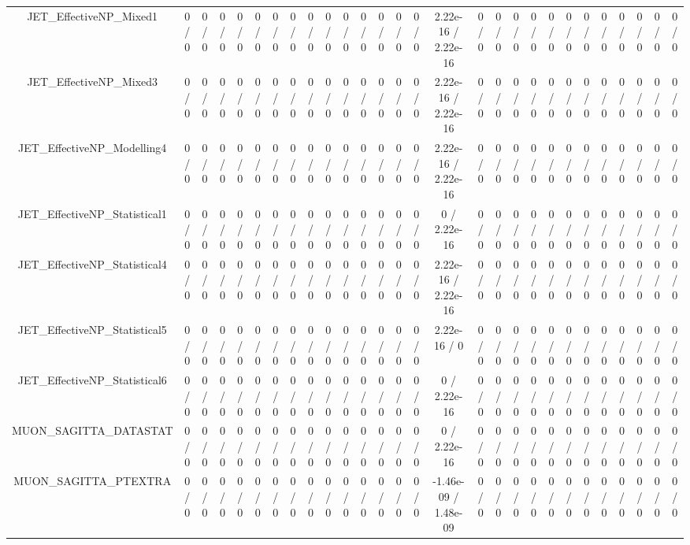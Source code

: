 \documentclass[10pt]{article}
\begin{document}
\begin{table}[htbp]
\begin{center}
\begin{tabular}{|c|c|c|c|c|c|c|c|c|c|c|c|c|c|c|c|c|c|c|c|c|c|c|c|c|c|c|c|}
  JET_EffectiveNP_Mixed1 & 0 / 0 & 0 / 0 & 0 / 0 & 0 / 0 & 0 / 0 & 0 / 0 & 0 / 0 & 0 / 0 & 0 / 0 & 0 / 0 & 0 / 0 & 0 / 0 & 0 / 0 & 0 / 0 & 2.22e-16 / 2.22e-16 & 0 / 0 & 0 / 0 & 0 / 0 & 0 / 0 & 0 / 0 & 0 / 0 & 0 / 0 & 0 / 0 & 0 / 0 & 0 / 0 & 0 / 0 & 0 / 0 \\ 
  JET_EffectiveNP_Mixed3 & 0 / 0 & 0 / 0 & 0 / 0 & 0 / 0 & 0 / 0 & 0 / 0 & 0 / 0 & 0 / 0 & 0 / 0 & 0 / 0 & 0 / 0 & 0 / 0 & 0 / 0 & 0 / 0 & 2.22e-16 / 2.22e-16 & 0 / 0 & 0 / 0 & 0 / 0 & 0 / 0 & 0 / 0 & 0 / 0 & 0 / 0 & 0 / 0 & 0 / 0 & 0 / 0 & 0 / 0 & 0 / 0 \\ 
  JET_EffectiveNP_Modelling4 & 0 / 0 & 0 / 0 & 0 / 0 & 0 / 0 & 0 / 0 & 0 / 0 & 0 / 0 & 0 / 0 & 0 / 0 & 0 / 0 & 0 / 0 & 0 / 0 & 0 / 0 & 0 / 0 & 2.22e-16 / 2.22e-16 & 0 / 0 & 0 / 0 & 0 / 0 & 0 / 0 & 0 / 0 & 0 / 0 & 0 / 0 & 0 / 0 & 0 / 0 & 0 / 0 & 0 / 0 & 0 / 0 \\ 
  JET_EffectiveNP_Statistical1 & 0 / 0 & 0 / 0 & 0 / 0 & 0 / 0 & 0 / 0 & 0 / 0 & 0 / 0 & 0 / 0 & 0 / 0 & 0 / 0 & 0 / 0 & 0 / 0 & 0 / 0 & 0 / 0 & 0 / 2.22e-16 & 0 / 0 & 0 / 0 & 0 / 0 & 0 / 0 & 0 / 0 & 0 / 0 & 0 / 0 & 0 / 0 & 0 / 0 & 0 / 0 & 0 / 0 & 0 / 0 \\ 
  JET_EffectiveNP_Statistical4 & 0 / 0 & 0 / 0 & 0 / 0 & 0 / 0 & 0 / 0 & 0 / 0 & 0 / 0 & 0 / 0 & 0 / 0 & 0 / 0 & 0 / 0 & 0 / 0 & 0 / 0 & 0 / 0 & 2.22e-16 / 2.22e-16 & 0 / 0 & 0 / 0 & 0 / 0 & 0 / 0 & 0 / 0 & 0 / 0 & 0 / 0 & 0 / 0 & 0 / 0 & 0 / 0 & 0 / 0 & 0 / 0 \\ 
  JET_EffectiveNP_Statistical5 & 0 / 0 & 0 / 0 & 0 / 0 & 0 / 0 & 0 / 0 & 0 / 0 & 0 / 0 & 0 / 0 & 0 / 0 & 0 / 0 & 0 / 0 & 0 / 0 & 0 / 0 & 0 / 0 & 2.22e-16 / 0 & 0 / 0 & 0 / 0 & 0 / 0 & 0 / 0 & 0 / 0 & 0 / 0 & 0 / 0 & 0 / 0 & 0 / 0 & 0 / 0 & 0 / 0 & 0 / 0 \\ 
  JET_EffectiveNP_Statistical6 & 0 / 0 & 0 / 0 & 0 / 0 & 0 / 0 & 0 / 0 & 0 / 0 & 0 / 0 & 0 / 0 & 0 / 0 & 0 / 0 & 0 / 0 & 0 / 0 & 0 / 0 & 0 / 0 & 0 / 2.22e-16 & 0 / 0 & 0 / 0 & 0 / 0 & 0 / 0 & 0 / 0 & 0 / 0 & 0 / 0 & 0 / 0 & 0 / 0 & 0 / 0 & 0 / 0 & 0 / 0 \\ 
  MUON_SAGITTA_DATASTAT & 0 / 0 & 0 / 0 & 0 / 0 & 0 / 0 & 0 / 0 & 0 / 0 & 0 / 0 & 0 / 0 & 0 / 0 & 0 / 0 & 0 / 0 & 0 / 0 & 0 / 0 & 0 / 0 & 0 / 2.22e-16 & 0 / 0 & 0 / 0 & 0 / 0 & 0 / 0 & 0 / 0 & 0 / 0 & 0 / 0 & 0 / 0 & 0 / 0 & 0 / 0 & 0 / 0 & 0 / 0 \\ 
  MUON_SAGITTA_PTEXTRA & 0 / 0 & 0 / 0 & 0 / 0 & 0 / 0 & 0 / 0 & 0 / 0 & 0 / 0 & 0 / 0 & 0 / 0 & 0 / 0 & 0 / 0 & 0 / 0 & 0 / 0 & 0 / 0 & -1.46e-09 / 1.48e-09 & 0 / 0 & 0 / 0 & 0 / 0 & 0 / 0 & 0 / 0 & 0 / 0 & 0 / 0 & 0 / 0 & 0 / 0 & 0 / 0 & 0 / 0 & 0 / 0 \\ 

\end{tabular}
\end{center}
\end{table}
\end{document}
